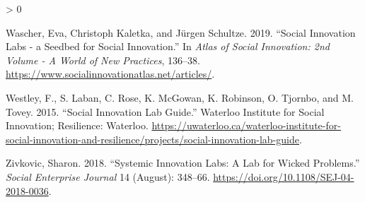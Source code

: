 \documentclass[AMA,STIX1COL,APA,STIX2COL]{WileyNJD-v2}
\newlength{\cslhangindent}
\newenvironment{CSLReferences}[2] %
 {%
  \setlength{\parindent}{0pt}
  \ifodd #1 \everypar{\setlength{\hangindent}{\cslhangindent}}\ignorespaces\fi
  \ifnum #2 > 0
  \setlength{\parskip}{#2\baselineskip}
  \fi
 }%
 {}
\begin{document}
\begin{CSLReferences}{1}{0}
\leavevmode\hypertarget{ref-Wascher2019}{}%
Wascher, Eva, Christoph Kaletka, and Jürgen Schultze. 2019. {``Social
Innovation Labs - a Seedbed for Social Innovation.''} In \emph{Atlas of
Social Innovation: 2nd Volume - A World of New Practices}, 136--38.
\url{https://www.socialinnovationatlas.net/articles/}.

\leavevmode\hypertarget{ref-Westley2015}{}%
Westley, F., S. Laban, C. Rose, K. McGowan, K. Robinson, O. Tjornbo, and
M. Tovey. 2015. {``Social Innovation Lab Guide.''} Waterloo Institute
for Social Innovation; Resilience: Waterloo.
\url{https://uwaterloo.ca/waterloo-institute-for-social-innovation-and-resilience/projects/social-innovation-lab-guide}.

\leavevmode\hypertarget{ref-Zivkovic2018}{}%
Zivkovic, Sharon. 2018. {``Systemic Innovation Labs: A Lab for Wicked
Problems.''} \emph{Social Enterprise Journal} 14 (August): 348--66.
\url{https://doi.org/10.1108/SEJ-04-2018-0036}.

\end{CSLReferences}


\end{document}
